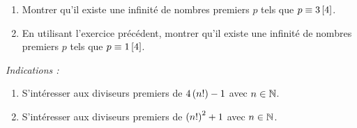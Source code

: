 \begin{exo}[Exercice 19]
\begin{enumerate}
\item Montrer qu'il existe une infinité de nombres premiers \(p\) tels que \(p\equiv3\left[4\right]\). \\

\item En utilisant l'exercice précédent, montrer qu'il existe une infinité de nombres premiers \(p\) tels que \(p\equiv1\left[4\right]\).
\end{enumerate}

\textit{Indications :}

\begin{enumerate}
\item S'intéresser aux diviseurs premiers de \(4\left(n!\right)-1\) avec \(n\in\mathbb{N}\). \\

\item S'intéresser aux diviseurs premiers de \(\left(n!\right)^2+1\) avec \(n\in\mathbb{N}\).
\end{enumerate}
\end{exo}

\begin{corr}
\end{corr}